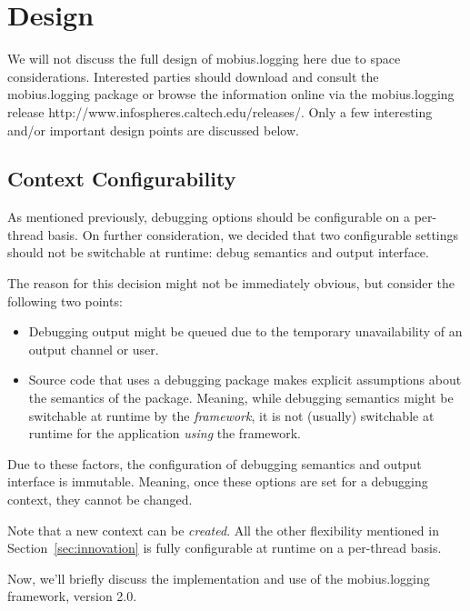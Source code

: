 \documentclass{article}
\begin{document}
\section{Design}

We will not discuss the full design of mobius.logging here due to space
considerations.  Interested parties should download and consult the
mobius.logging package or browse the information online via the mobius.logging release
{http://www.infospheres.caltech.edu/releases/}.  Only a few
interesting and/or important design points are discussed below.

\subsection{Context Configurability}

As mentioned previously, debugging options should be configurable on a
per-thread basis.  On further consideration, we decided that two
configurable settings should not be switchable at runtime: debug
semantics and output interface.

The reason for this decision might not be immediately obvious, but
consider the following two points:
\begin{itemize}
\item Debugging output might be queued due to the temporary
  unavailability of an output channel or user.
\item Source code that uses a debugging package makes explicit
  assumptions about the semantics of the package.  Meaning, while
  debugging semantics might be switchable at runtime by the
  \emph{framework}, it is not (usually) switchable at runtime for the
  application \emph{using} the framework.
\end{itemize}

Due to these factors, the configuration of debugging semantics and
output interface is immutable.  Meaning, once these options are set
for a debugging context, they cannot be changed.

Note that a new context can be \emph{created}.  All the other
flexibility mentioned in Section~\ref{sec:innovation} is fully
configurable at runtime on a per-thread basis.

Now, we'll briefly discuss the implementation and use of the mobius.logging
framework, version 2.0.

\end{document}
